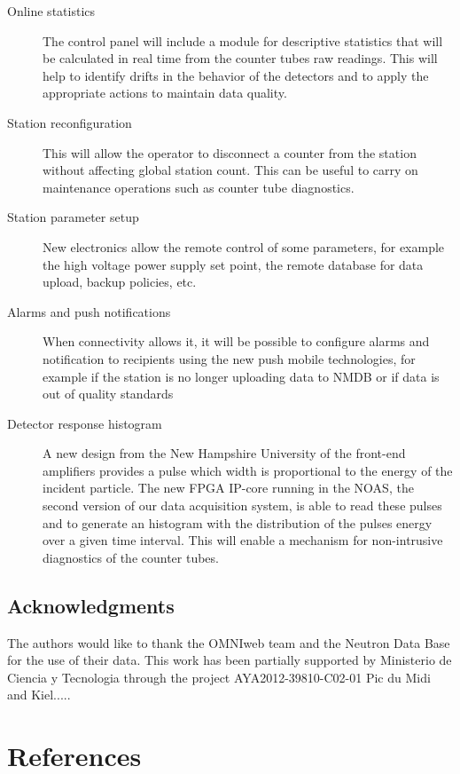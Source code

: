 \documentclass[a4paper]{jpconf}
\begin{document}
\begin{description}
    \item[Online statistics] The control panel will include a module for
        descriptive statistics that will be calculated in real time from the
        counter tubes raw readings. This will help to identify drifts in the
        behavior of the detectors and to apply the appropriate actions to
        maintain data quality.
    \item[Station reconfiguration] This will allow the operator to disconnect a
        counter from the station without affecting global station count. This
        can be useful to carry on maintenance operations such as counter tube
        diagnostics. 
    \item[Station parameter setup] New electronics allow the remote control of
        some parameters, for example the high voltage power supply set point,
        the remote database for data upload, backup policies, etc.
    \item[Alarms and push notifications] When connectivity allows it, it will
        be possible to configure alarms and notification to recipients using
        the new push mobile technologies, for example if the station is no
        longer uploading data to NMDB or if data is out of quality standards
    \item[Detector response histogram] A new design from the New
        Hampshire University of the front-end amplifiers provides a pulse which
        width is proportional to the energy of the incident particle. The new
        FPGA IP-core running in the NOAS, the second version of our data
        acquisition system, is able to read these pulses and to generate an
        histogram with the distribution of the pulses energy over a given time
        interval. This will enable a mechanism for non-intrusive diagnostics of
        the counter tubes. 
\end{description}


\subsection*{Acknowledgments} 
The authors would like to thank the OMNIweb team and the Neutron
Data Base for the use of their data. This work has been partially supported by
Ministerio de Ciencia y Tecnologia through the project AYA2012-39810-C02-01
Pic du Midi and Kiel.....



\section*{References}
 
\end{document}
